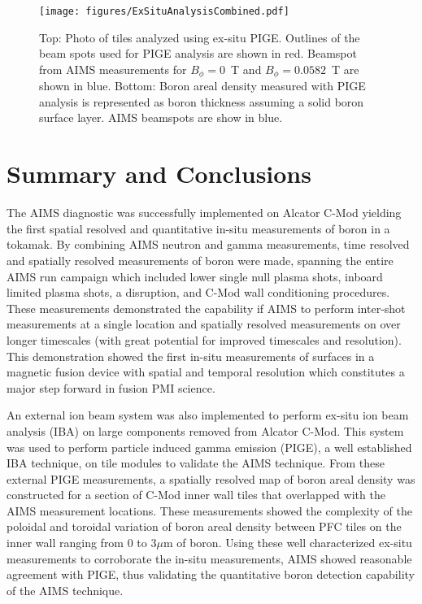 \documentclass[final,3p,times,twocolumn]{elsarticle}
\begin{document}
\begin{figure}[h!]
 \centering
  \texttt{[image: figures/ExSituAnalysisCombined.pdf]}
 \caption{Top: Photo of tiles analyzed using ex-situ PIGE. Outlines of the beam spots used for PIGE analysis are shown in red. Beamspot from AIMS measurements for $B_\phi=0$~T and $B_\phi = 0.0582$~T are shown in blue. Bottom: Boron areal density measured with PIGE analysis is represented as boron thickness assuming a solid boron surface layer. AIMS beamspots are show in blue.}
 \label{fig:ExSituAnalysis}
\end{figure}

\section{Summary and Conclusions}

The AIMS diagnostic was successfully implemented on Alcator C-Mod yielding the first spatial resolved and quantitative in-situ measurements of boron in a tokamak.  By combining AIMS neutron and gamma measurements, time resolved and spatially resolved measurements of boron were made, spanning the entire AIMS run campaign which included lower single null plasma shots, inboard limited plasma shots, a disruption, and C-Mod wall conditioning procedures.  These measurements demonstrated the capability if AIMS to perform inter-shot measurements at a single location and spatially resolved measurements on over longer timescales (with great potential for improved timescales and resolution).  This demonstration showed the first in-situ measurements of surfaces in a magnetic fusion device with spatial and temporal resolution which constitutes a major step forward in fusion PMI science.

An external ion beam system was also implemented to perform ex-situ ion beam analysis (IBA) on large components removed from Alcator C-Mod.  This system was used to perform particle induced gamma emission (PIGE), a well established IBA technique, on tile modules to validate the AIMS technique.  From these external PIGE measurements, a spatially resolved map of boron areal density was constructed for a section of C-Mod inner wall tiles that overlapped with the AIMS measurement locations.  These measurements showed the complexity of the poloidal and toroidal variation of boron areal density between PFC tiles on the inner wall ranging from 0 to 3$\mu$m of boron.  Using these well characterized ex-situ measurements to corroborate the in-situ measurements, AIMS showed reasonable agreement with PIGE, thus validating the quantitative boron detection capability of the AIMS technique.



\end{document}
